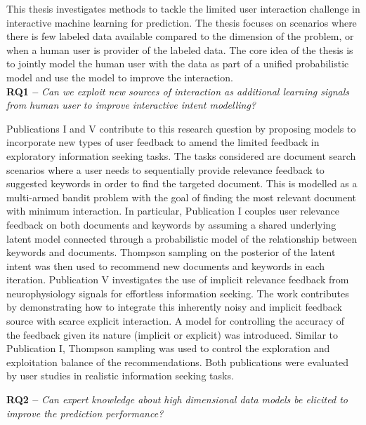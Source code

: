 \documentclass[dissertation,math,vertlayout,pdfa,colorlinks]{aaltoseries}
\begin{document}
This thesis investigates methods to tackle the limited user interaction challenge in interactive machine learning for prediction. The thesis focuses on scenarios where there is few labeled data available compared to the dimension of the problem, or when a human user is provider of the labeled data. The core idea of the thesis is to jointly model the human user with the data as part of a unified probabilistic model and use the model to improve the interaction.\\

\noindent \textbf{RQ1 --} \textit{Can we exploit new sources of interaction as additional learning signals from human user to improve interactive intent modelling?}

Publications I and V contribute to this research question by proposing models to incorporate new types of user feedback to amend the limited feedback in exploratory information seeking tasks. The tasks considered are document search scenarios where a user needs to sequentially provide relevance feedback to suggested keywords in order to find the targeted document. This is modelled as a multi-armed bandit problem with the goal of finding the most relevant document with minimum interaction. In particular, Publication I couples user relevance feedback on both documents and keywords by assuming a shared underlying latent model connected through a probabilistic model of the relationship between keywords and documents. Thompson sampling on the posterior of the latent intent was then used to recommend new documents and keywords in each iteration. Publication V investigates the use of implicit relevance feedback from neurophysiology signals for effortless information seeking. The work contributes by demonstrating how to integrate this inherently noisy and implicit feedback source with scarce explicit interaction. A model for controlling the accuracy of the feedback given its nature (implicit or explicit) was introduced. Similar to Publication I, Thompson sampling was used to control the exploration and exploitation balance of the recommendations. Both publications were evaluated by user studies in realistic information seeking tasks. 


\noindent \textbf{RQ2 --} \textit{Can expert knowledge about high dimensional data models be elicited to improve the prediction performance?}
\end{document}
